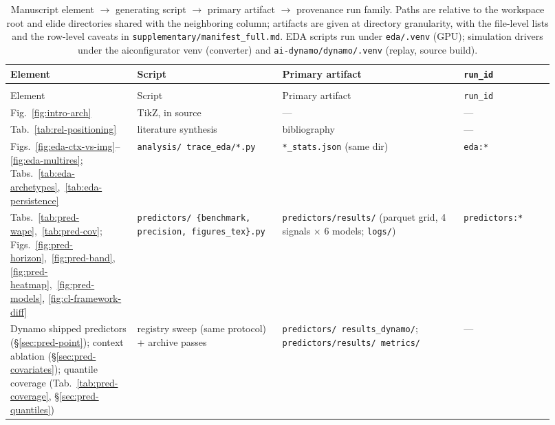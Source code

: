 {\scriptsize\setlength{\tabcolsep}{2.5pt}
\begin{longtable}{@{}>{\raggedright\arraybackslash}p{0.215\linewidth}>{\raggedright\arraybackslash}p{0.245\linewidth}>{\raggedright\arraybackslash}p{0.30\linewidth}>{\raggedright\arraybackslash}p{0.155\linewidth}@{}}
\caption[Manuscript element $\to$ script $\to$ artifact $\to$ provenance
run]{Manuscript element $\to$ generating script $\to$ primary artifact $\to$
provenance run family. Paths are relative to the workspace root and elide
directories shared with the neighboring column; artifacts are given at
directory granularity, with the file-level lists and the row-level caveats in
\texttt{supplementary/\allowbreak manifest\_full.md}. EDA scripts run under
\texttt{eda/.venv} (GPU); simulation drivers under the aiconfigurator venv
(converter) and \texttt{ai-dynamo/dynamo/.venv} (replay, source build).}
\label{tab:ap-manifest}\\
\toprule
Element & Script & Primary artifact & \texttt{run\_id} \\
\midrule
\endfirsthead
\multicolumn{4}{@{}l}{\scriptsize\emph{(Table~\ref{tab:ap-manifest} continued)}}\\
\toprule
Element & Script & Primary artifact & \texttt{run\_id} \\
\midrule
\endhead
\bottomrule
\endlastfoot
Fig.~\ref{fig:intro-arch} & TikZ, in source & --- & --- \\
Tab.~\ref{tab:rel-positioning} & literature synthesis & bibliography & --- \\
Figs.~\ref{fig:eda-ctx-vs-img}--\ref{fig:eda-multires};
  Tabs.~\ref{tab:eda-archetypes},~\ref{tab:eda-persistence} &
  \texttt{analysis/ trace\_eda/*.py} &
  \texttt{*\_stats.json} (same dir) & \texttt{eda:*} \\
Tabs.~\ref{tab:pred-wape},~\ref{tab:pred-cov};
  Figs.~\ref{fig:pred-horizon},~\ref{fig:pred-band},
  \ref{fig:pred-heatmap},~\ref{fig:pred-models},
  \ref{fig:cl-framework-diff} &
  \texttt{predictors/ \{benchmark, precision, figures\_tex\}.py} &
  \texttt{predictors/results/} (parquet grid, 4 signals $\times$ 6 models;
  \texttt{logs/}) & \texttt{predictors:*} \\
Dynamo shipped predictors (\S\ref{sec:pred-point}); context ablation
  (\S\ref{sec:pred-covariates}); quantile coverage
  (Tab.~\ref{tab:pred-coverage}, \S\ref{sec:pred-quantiles}) &
  registry sweep (same protocol) + archive passes &
  \texttt{predictors/ results\_dynamo/}; \texttt{predictors/results/ metrics/}
  & --- \\

\end{longtable}}
